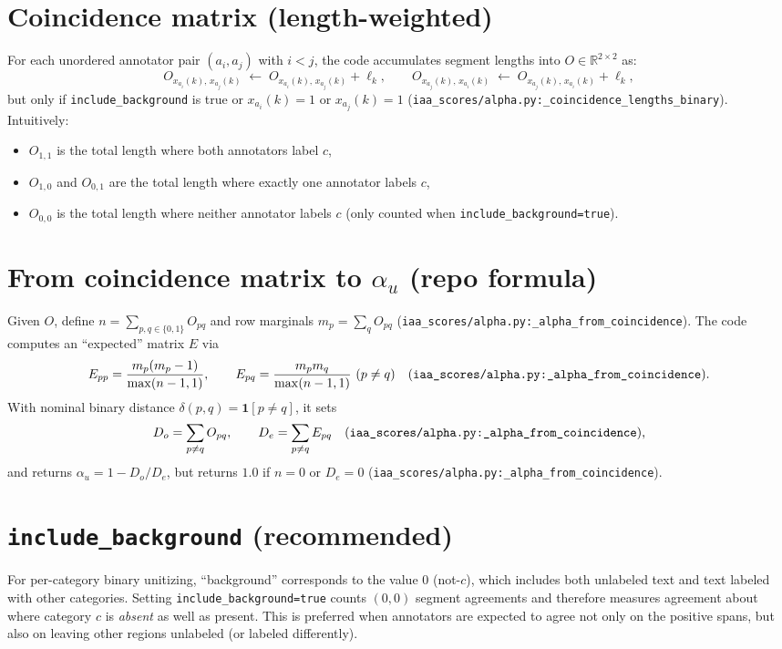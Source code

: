 \documentclass[11pt]{article}
\begin{document}
\section*{Coincidence matrix (length-weighted)}
For each unordered annotator pair $(a_i,a_j)$ with $i<j$, the code accumulates segment lengths into
$O\in\mathbb{R}^{2\times 2}$ as:
\[
O_{x_{a_i}(k),\,x_{a_j}(k)} \;\leftarrow\; O_{x_{a_i}(k),\,x_{a_j}(k)} + \ell_k,
\qquad
O_{x_{a_j}(k),\,x_{a_i}(k)} \;\leftarrow\; O_{x_{a_j}(k),\,x_{a_i}(k)} + \ell_k,
\]
but only if \texttt{include\_background} is true or $x_{a_i}(k)=1$ or $x_{a_j}(k)=1$
(\texttt{iaa\_scores/alpha.py:\_coincidence\_lengths\_binary}).
Intuitively:
\begin{itemize}[leftmargin=*,nosep]
  \item $O_{1,1}$ is the total length where both annotators label $c$,
  \item $O_{1,0}$ and $O_{0,1}$ are the total length where exactly one annotator labels $c$,
  \item $O_{0,0}$ is the total length where neither annotator labels $c$ (only counted when \texttt{include\_background=true}).
\end{itemize}

\section*{From coincidence matrix to $\alpha_u$ (repo formula)}
Given $O$, define $n=\sum_{p,q\in\{0,1\}}O_{pq}$ and row marginals $m_p=\sum_{q}O_{pq}$
(\texttt{iaa\_scores/alpha.py:\_alpha\_from\_coincidence}). The code computes an ``expected'' matrix $E$ via
\[
E_{pp}=\frac{m_p(m_p-1)}{\max(n-1,1)},\qquad
E_{pq}=\frac{m_pm_q}{\max(n-1,1)} \ (p\ne q)
\quad\text{(\texttt{iaa\_scores/alpha.py:\_alpha\_from\_coincidence}).}
\]
With nominal binary distance $\delta(p,q)=\mathbf{1}[p\ne q]$, it sets
\[
D_o=\sum_{p\ne q} O_{pq},\qquad D_e=\sum_{p\ne q} E_{pq}
\quad\text{(\texttt{iaa\_scores/alpha.py:\_alpha\_from\_coincidence}),}
\]
and returns $\alpha_u=1-D_o/D_e$, but returns $1.0$ if $n=0$ or $D_e=0$
(\texttt{iaa\_scores/alpha.py:\_alpha\_from\_coincidence}).

\section*{\texttt{include\_background} (recommended)}
For per-category binary unitizing, ``background'' corresponds to the value $0$ (not-$c$), which includes
both unlabeled text and text labeled with other categories.
Setting \texttt{include\_background=true} counts $(0,0)$ segment agreements and therefore measures agreement
about where category $c$ is \emph{absent} as well as present. This is preferred when annotators are expected
to agree not only on the positive spans, but also on leaving other regions unlabeled (or labeled differently).
\end{document}
